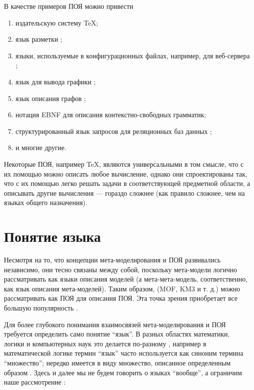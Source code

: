 В качестве примеров ПОЯ можно привести
\begin{enumerate}
\item издательскую систему \TeX ;
\item язык разметки ;
\item языки, используемые в конфигурационных файлах, например, для веб-сервера ;
\item язык для вывода графики ;
\item язык описания графов ;
\item нотация EBNF для описания контекстно-свободных грамматик;
\item структурированный язык запросов для реляционных баз данных ;
\item и многие другие.
\end{enumerate}

Некоторые ПОЯ, например \TeX , являются универсальными в том смысле, что с их помощью можно описать любое вычисление, однако они спроектированы так, что с их помощью легко решать задачи в соответствующей предметной области, а описывать другие вычисления --- гораздо сложнее (как правило сложнее, чем на языках общего назначения).

\chapter{Понятие языка}

Несмотря на то, что концепции мета-моделирования и ПОЯ развивались независимо, они тесно связаны между собой, поскольку мета-модели логично рассматривать как языки описания моделей (а мета-мета-модель, соответственно, как язык описания мета-моделей). Таким образом,  (MOF, KM3 и т. д.) можно рассматривать как ПОЯ для описания ПОЯ. Эта точка зрения приобретает все большую популярность \cite{}.

Для более глубокого понимания взаимосвязей мета-моделирования и ПОЯ требуется определить само понятие ``язык''. В разных областях математики, логики и компьютерных наук это делается по-разному \cite{???}, например в математической логике термин ``язык'' часто используется как синоним термина ``множество''; нередко имеется в виду множество, описанное определенным образом \cite{}. Здесь и далее мы не будем говорить о языках ``вообще'', а ограничим наше рассмотрение :

\newcommand{\Lang}[1]{\mathcal{L}\left(#1\right)}%
\newcommand{\LMM}[1]{\Lang{\MM{#1}}}%


